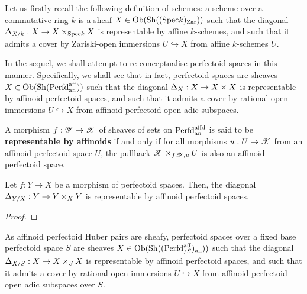             \begin{remark} 
                Let us firstly recall the following definition of schemes: a scheme over a commutative ring $k$ is a sheaf $X \in \mathrm{Ob}(\mathrm{Sh}((\mathrm{Spec} k)_{\mathrm{Zar}}))$ such that the diagonal $\Delta_{X/k}: X \to X \x_{\Spec k} X$ is representable by affine $k$-schemes, and such that it admits a cover by Zariski-open immersions $U \hookrightarrow X$ from affine $k$-schemes $U$.
                
                In the sequel, we shall attempt to re-conceptualise perfectoid spaces in this manner. Specifically, we shall see that in fact, perfectoid spaces are sheaves $X \in \mathrm{Ob}(\mathrm{Sh}(\mathrm{Perfd}^{\mathrm{aff}}_{\mathrm{an}}))$ such that the diagonal $\Delta_X: X \to X \x X$ is representable by affinoid perfectoid spaces, and such that it admits a cover by rational open immersions $U \hookrightarrow X$ from affinoid perfectoid open adic subspaces. 
            \end{remark}
            \begin{definition} \label{def: representable_morphisms_of_perfectoid_spaces}
                A morphism $f: \mathscr{Y} \to \mathscr{X}$ of sheaves of sets on $\mathrm{Perfd}^{\mathrm{affd}}_{\mathrm{an}}$ is said to be \textbf{representable by affinoids} if and only if for all morphisms $u: U \to \mathscr{X}$ from an affinoid perfectoid space $U$, the pullback $\scrX \x_{f, \scrY, u} U$ is also an affinoid perfectoid space. 
            \end{definition}
            \begin{lemma} \label{lemma: diagonals_of_perfectoid_spaces_are_representable_by_affinoids}
                Let $f: Y \to X$ be a morphism of perfectoid spaces. Then, the diagonal $\Delta_{Y/X}: Y \to Y \x_X Y$ is representable by affinoid perfectoid spaces.
            \end{lemma}
                \begin{proof}
                    
                \end{proof}
            \begin{corollary}
                As affinoid perfectoid Huber pairs are sheafy, perfectoid spaces over a fixed base perfectoid space $S$ are sheaves $X \in \mathrm{Ob}(\mathrm{Sh}((\mathrm{Perfd}^{\mathrm{aff}}_{/S})_{\mathrm{an}}))$ such that the diagonal $\Delta_{X/S}: X \to X \x_S X$ is representable by affinoid perfectoid spaces, and such that it admits a cover by rational open immersions $U \hookrightarrow X$ from affinoid perfectoid open adic subspaces over $S$. 
            \end{corollary}
